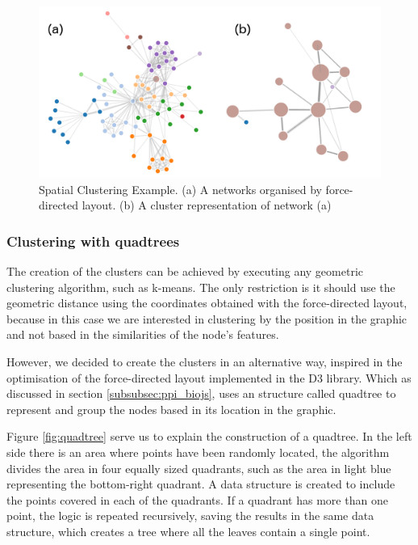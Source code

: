 \begin{figure}[ht]
\centering
\includegraphics[width=\textwidth]{figures/spatial_clustring.png}
\caption[Spatial Clustering Example.]{Spatial Clustering Example. (a) A networks organised by force-directed layout. (b) A cluster representation of network (a)
\label{fig:spatial_clustring}}
\end{figure}

\subsubsection{Clustering with quadtrees}
The creation of the clusters can be achieved by executing any geometric clustering algorithm, such as k-means. The only restriction is it should use the geometric distance using the coordinates obtained with the force-directed layout, because in this case we are interested in clustering by the position in the graphic and not based in the similarities of the node's features.

However, we decided to create the clusters in an alternative way, inspired in the optimisation of the force-directed layout implemented in the D3 library. Which as discussed in section \ref{subsubsec:ppi_biojs}, uses an structure called quadtree to represent and group the nodes based in its location in the graphic.
 
Figure \ref{fig:quadtree} serve us to explain the construction of a quadtree. In the left side there is an area where points have been randomly located, the algorithm divides the area in four equally sized quadrants, such as the area in light blue representing the bottom-right quadrant. A data structure is created to include the points covered in each of the quadrants. If a quadrant has more than one point, the logic is repeated recursively, saving the results in the same data structure, which creates a tree where all the leaves contain a single point. 

